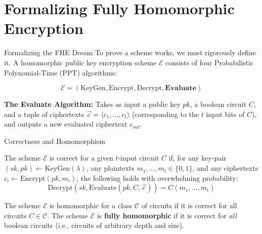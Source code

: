 \documentclass[10pt, aspectratio=169]{beamer}
\begin{document}
\section{Formalizing Fully Homomorphic Encryption}

\begin{frame}{Formalizing the FHE Dream}
    To prove a scheme works, we must rigorously define it. A homomorphic public key encryption scheme $\mathcal{E}$ consists of four Probabilistic Polynomial-Time (PPT) algorithms:
    
    \pause
    $$\mathcal{E} = (\text{KeyGen}, \text{Encrypt}, \text{Decrypt}, \textbf{Evaluate})$$
    
    \vspace{0.3cm}
    \textbf{The Evaluate Algorithm:}
    Takes as input a public key $pk$, a boolean circuit $C$, and a tuple of ciphertexts $\vec{c}=\langle c_{1},...,c_{t}\rangle$ (corresponding to the $t$ input bits of $C$), and outputs a new evaluated ciphertext $c_{out}$.
\end{frame}

\begin{frame}{Correctness and Homomorphism}
    \begin{definition}
    The scheme $\mathcal{E}$ is correct for a given $t$-input circuit $C$ if, for any key-pair $(sk,pk)\leftarrow \text{KeyGen}(\lambda)$, any plaintexts $m_{1},...,m_{t}\in\{0,1\}$, and any ciphertexts $c_{i}\leftarrow \text{Encrypt}(pk,m_{i})$, the following holds with overwhelming probability:
    $$\text{Decrypt}(sk,\text{Evaluate}(pk,C,\vec{c}))=C(m_{1},...,m_{t})$$
    \end{definition}
    \pause

    \vspace{0.3cm}
    \begin{definition}
    The scheme $\mathcal{E}$ is homomorphic for a class $\mathcal{C}$ of circuits if it is correct for all circuits $C\in\mathcal{C}$. The scheme $\mathcal{E}$ is \textbf{fully homomorphic} if it is correct for \textit{all} boolean circuits (i.e., circuits of arbitrary depth and size).
    \end{definition}
\end{frame}
\end{document}
